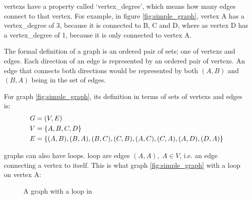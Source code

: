     \Glspl{vertex} have a property called `\gls{vertex_degree}', which means how many \glspl{edge} connect to that \gls{vertex}.
    For example, in figure \ref{fig:simple_graph}, \gls{vertex} A has a \gls{vertex_degree} of 3, because it is connected to B, C and D, where as \gls{vertex} D has a \gls{vertex_degree} of 1, because it is only connected to \gls{vertex} A.

    The formal definition of a \gls{graph} is an ordered pair of sets; one of \glspl{vertex} and \glspl{edge}.
    Each direction of an \gls{edge} is represented by an ordered pair of \glspl{vertex}.
    An \gls{edge} that connects both directions would be represented by both $(A,B)$ and $(B,A)$ being in the set of \glspl{edge}.

    For \gls{graph} \ref{fig:simple_graph}, its definition in terms of sets of \glspl{vertex} and \glspl{edge} is:
    \begin{align}
        G&=(V,E) \\
        V&=\left\{A,B,C,D\right\} \\
        E&=\left\{(A,B),(B,A),(B,C),(C,B),(A,C),(C,A),(A,D),(D,A)\right\}
    \end{align}

    \Glspl{graph} can also have \glspl{loop}.
    \Gls{loop} are \glspl{edge} $(A,A),\;A\in V$, i.e. an \gls{edge} connecting a \gls{vertex} to itself.
    This is what \gls{graph} \ref{fig:simple_graph} with a \gls{loop} on \gls{vertex} A:

    \begin{figure}
        \centering
        \caption{A \gls{graph} with a \gls{loop} in}
    \end{figure}

